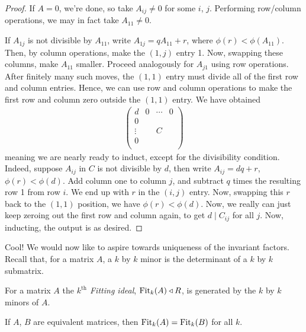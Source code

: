 \documentclass{../../template/note}
\begin{document}
    \begin{proof}
        If $A = 0$, we're done, so take $A_{ij} \neq 0$ for some $i$, $j$. Performing row/column operations, we may in fact take $A_{11} \neq 0$.

        If $A_{1j}$ is not divisible by $A_{11}$, write $A_{1j} = qA_{11} + r$, where $\phi(r) < \phi(A_{11})$. Then, by column operations, make the $(1, j)$ entry 1. Now, swapping these columns, make $A_{11}$ smaller. Proceed analogously for $A_{j1}$ using row operations. After finitely many such moves, the $(1, 1)$ entry must divide all of the first row and column entries. Hence, we can use row and column operations to make the first row and column zero outside the $(1, 1)$ entry. We have obtained
        \begin{align*}
            \begin{pmatrix}
                d & 0 & \cdots & 0 \\
                0 &  &  &  \\
                \vdots &  & C &  \\
                0 &  &  &  \\
            \end{pmatrix}
        \end{align*}
        meaning we are nearly ready to induct, except for the divisibility condition. Indeed, suppose $A_{ij}$ in $C$ is not divisible by $d$, then write $A_{ij} = dq + r$, $\phi(r) < \phi(d)$. Add column one to column $j$, and subtract $q$ times the resulting row 1 from row $i$. We end up with $r$ in the $(i, j)$ entry. Now, swapping this $r$ back to the $(1, 1)$ position, we have $\phi(r) < \phi(d)$. Now, we really can just keep zeroing out the first row and column again, to get $d \mid C_{ij}$ for all $j$. Now, inducting, the output is as desired.     
    \end{proof}
    
    Cool! We would now like to aspire towards uniqueness of the invariant factors. Recall that, for a matrix $A$, a $k$ by $k$ minor is the determinant of a $k$ by $k$ submatrix.

    \begin{definition}
        For a matrix $A$ the \emph{$k^\text{th}$ Fitting ideal}, $\operatorname{Fit}_k(A) \triangleleft R$, is generated by the $k$ by $k$ minors of $A$.
    \end{definition}
    
    \begin{proposition}
        If $A$, $B$ are equivalent matrices, then $\operatorname{Fit}_k(A) = \operatorname{Fit}_k(B)$ for all $k$.
    \end{proposition}
  
\end{document}
